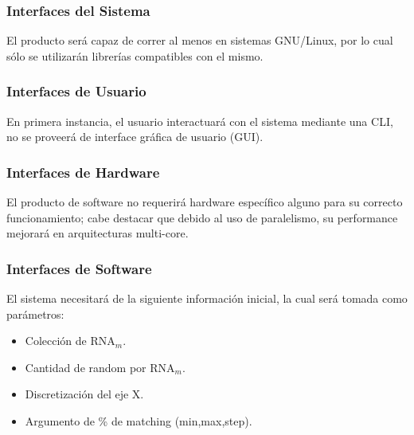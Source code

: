 \documentclass[12pt,a4paper,spanish]{article}
\begin{document}
	\subsubsection{Interfaces del Sistema}
		El producto será capaz de correr al menos en sistemas GNU/Linux, por lo cual sólo se utilizarán librerías compatibles con el mismo.

	\subsubsection{Interfaces de Usuario}		
		En primera instancia, el usuario interactuará con el sistema mediante una CLI, no se proveerá de interface gráfica de usuario (GUI).

	\subsubsection{Interfaces de Hardware}
		El producto de software no requerirá hardware específico alguno para su correcto funcionamiento; cabe destacar 	que debido al uso de paralelismo, 			su performance mejorará en arquitecturas multi-core.

	\subsubsection{Interfaces de Software}
		\par El sistema necesitará de la siguiente información inicial, la cual será tomada como parámetros:
			\begin{itemize}
				\item Colección de RNA$_m$.
				\item Cantidad de random por RNA$_m$. 
				\item Discretización del eje X. 
				\item Argumento de \% de matching (min,max,step).
			\end{itemize}
\end{document}
